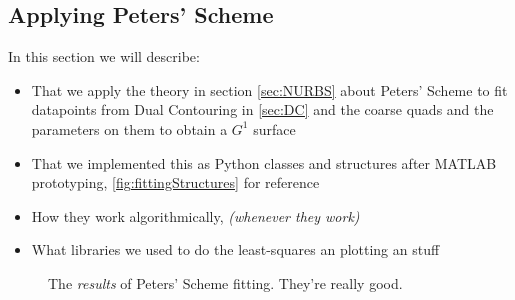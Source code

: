 \subsection{Applying Peters' Scheme}
In this section we will describe:
\begin{itemize}
\item That we apply the theory in section \autoref{sec:NURBS} about Peters' Scheme to fit datapoints from Dual Contouring in \autoref{sec:DC} and the coarse quads and the parameters on them to obtain a $G^1$ surface
\item That we implemented this as Python classes and structures after MATLAB prototyping, \autoref{fig:fittingStructures} for reference
\item How they work algorithmically, \textit{(whenever they work)}
\item What libraries we used to do the least-squares an plotting an stuff
\end{itemize}


\begin{figure}
\label{fig:fittingStructures}
\caption{The \emph{results} of Peters' Scheme fitting. They're really good.}
\end{figure}